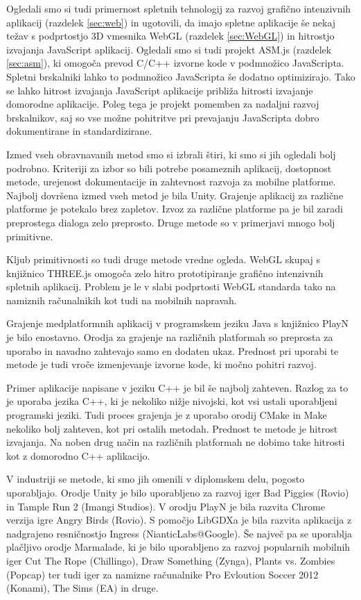 Ogledali smo si tudi primernost spletnih tehnologij za razvoj grafično intenzivnih aplikacij (razdelek \ref{sec:web}) in ugotovili, da imajo spletne aplikacije še nekaj težav s podprtostjo 3D vmesnika WebGL (razdelek \ref{sec:WebGL}) in hitrostjo izvajanja JavaScript aplikacij. Ogledali smo si tudi projekt ASM.js (razdelek \ref{sec:asm}), ki omogoča prevod C/C++ izvorne kode v podmnožico JavaScripta. Spletni brskalniki lahko to podmnožico JavaScripta še dodatno optimizirajo. Tako se lahko hitrost izvajanja JavaScript aplikacije približa hitrosti izvajanje domorodne aplikacije. Poleg tega je projekt pomemben za nadaljni razvoj brskalnikov, saj so vse možne pohitritve pri prevajanju JavaScripta dobro dokumentirane in standardizirane.

Izmed vseh obravnavanih metod smo si izbrali štiri, ki smo si jih ogledali bolj podrobno. Kriteriji za izbor so bili potrebe posameznih aplikacij, dostopnost metode, urejenost dokumentacije in zahtevnost razvoja za mobilne platforme. Najbolj dovršena izmed vseh metod je bila Unity. Grajenje aplikacij za različne platforme je potekalo brez zapletov. Izvoz za različne platforme pa je bil zaradi preprostega dialoga zelo preprosto. Druge metode so v primerjavi mnogo bolj primitivne.

Kljub primitivnosti so tudi druge metode vredne ogleda. WebGL skupaj s knjižnico THREE.js omogoča zelo hitro prototipiranje grafično intenzivnih spletnih aplikacij. Problem je le v slabi podprtosti WebGL standarda tako na namiznih računalnikih kot tudi na mobilnih napravah.

Grajenje medplatformnih aplikacij v programskem jeziku Java s knjižnico PlayN je bilo enostavno. Orodja za grajenje na različnih platformah so preprosta za uporabo in navadno zahtevajo samo en dodaten ukaz. Prednost pri uporabi te metode je tudi vroče izmenjevanje izvorne kode, ki močno pohitri razvoj. 

Primer aplikacije napisane v jeziku C++ je bil še najbolj zahteven. Razlog za to je uporaba jezika C++, ki je nekoliko nižje nivojski, kot vsi ustali uporabljeni programski jeziki. Tudi proces grajenja je z uporabo orodij CMake in Make nekoliko bolj zahteven, kot pri ostalih metodah. Prednost te metode je hitrost izvajanja. Na noben drug način na različnih platformah ne dobimo take hitrosti kot z domorodno C++ aplikacijo.

V industriji se metode, ki smo jih omenili v diplomskem delu, pogosto uporabljajo. Orodje Unity je bilo uporabljeno za razvoj iger Bad Piggies (Rovio) in Tample Run 2 (Imangi Studios). V orodju PlayN je bila razvita Chrome verzija igre Angry Birds (Rovio). S pomočjo LibGDXa je bila razvita aplikacija z nadgrajeno resničnostjo Ingress (NianticLabs@Google). Še največ pa se uporablja plačljivo orodje Marmalade, ki je bilo uporabljeno za razvoj popularnih mobilnih iger Cut The Rope (Chillingo), Draw Something (Zynga), Plants vs. Zombies (Popcap) ter tudi iger za namizne računalnike Pro Evloution Soccer 2012 (Konami), The Sims (EA) in druge.


